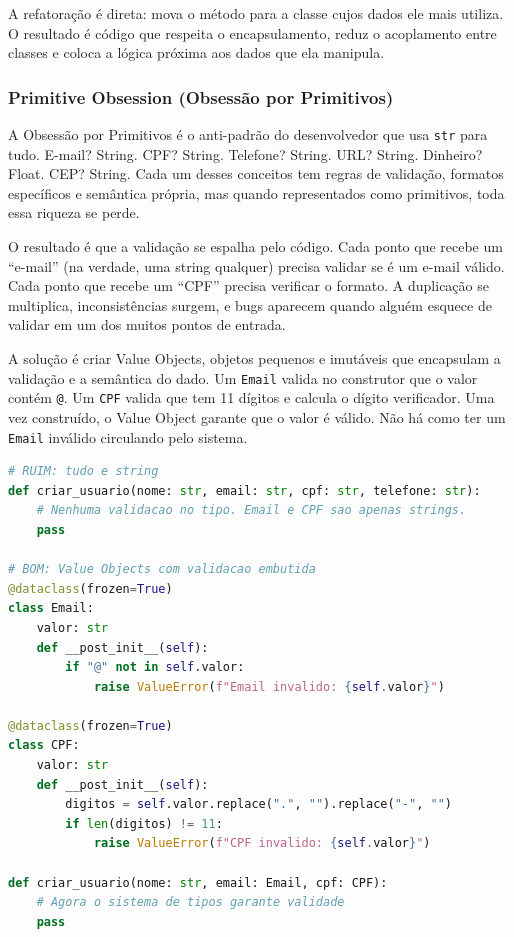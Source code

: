 A refatoração é direta: mova o método para a classe cujos dados ele mais
utiliza. O resultado é código que respeita o encapsulamento, reduz o
acoplamento entre classes e coloca a lógica próxima aos dados que ela
manipula.

\subsubsection{Primitive Obsession (Obsessão por Primitivos)}

A Obsessão por Primitivos é o anti-padrão do desenvolvedor que usa
\texttt{str} para tudo. E-mail? String. CPF? String. Telefone? String.
URL? String. Dinheiro? Float. CEP? String. Cada um desses conceitos tem
regras de validação, formatos específicos e semântica própria, mas quando
representados como primitivos, toda essa riqueza se perde.

O resultado é que a validação se espalha pelo código. Cada ponto que recebe
um ``e-mail'' (na verdade, uma string qualquer) precisa validar se é um
e-mail válido. Cada ponto que recebe um ``CPF'' precisa verificar o
formato. A duplicação se multiplica, inconsistências surgem, e bugs
aparecem quando alguém esquece de validar em um dos muitos pontos de
entrada.

A solução é criar Value Objects, objetos pequenos e imutáveis que
encapsulam a validação e a semântica do dado. Um \texttt{Email} valida no
construtor que o valor contém \texttt{@}. Um \texttt{CPF} valida que tem
11 dígitos e calcula o dígito verificador. Uma vez construído, o Value Object
garante que o valor é válido. Não há como ter um \texttt{Email} inválido
circulando pelo sistema.

\begin{lstlisting}[language=Python, caption={Code Smell: Primitive Obsession vs Value Objects}]
# RUIM: tudo e string
def criar_usuario(nome: str, email: str, cpf: str, telefone: str):
    # Nenhuma validacao no tipo. Email e CPF sao apenas strings.
    pass

# BOM: Value Objects com validacao embutida
@dataclass(frozen=True)
class Email:
    valor: str
    def __post_init__(self):
        if "@" not in self.valor:
            raise ValueError(f"Email invalido: {self.valor}")

@dataclass(frozen=True)
class CPF:
    valor: str
    def __post_init__(self):
        digitos = self.valor.replace(".", "").replace("-", "")
        if len(digitos) != 11:
            raise ValueError(f"CPF invalido: {self.valor}")

def criar_usuario(nome: str, email: Email, cpf: CPF):
    # Agora o sistema de tipos garante validade
    pass
\end{lstlisting}


